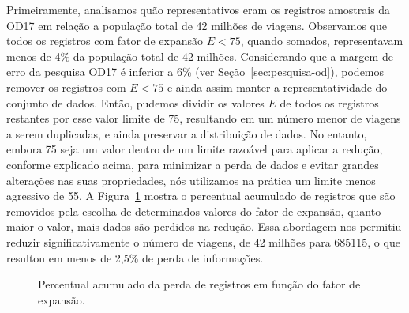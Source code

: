 Primeiramente, analisamos quão representativos eram os registros amostrais da
OD17 em relação a população total de 42 milhões de viagens. Observamos que todos os
registros com fator de expansão $E < 75$, quando somados, representavam menos de 4\% da população total de 42
milhões. Considerando que a margem de erro da pesquisa OD17 é inferior a 6\%
(ver Seção~\ref{sec:pesquisa-od}), podemos remover os registros com $E < 75$ e
ainda assim manter a representatividade do conjunto de dados. Então, pudemos dividir
os valores $E$ de todos os registros restantes por esse valor limite de 75,
resultando em um número menor de viagens a serem duplicadas, e ainda preservar
a distribuição de dados. No entanto, embora 75 seja um valor dentro de um
limite razoável para aplicar a redução, conforme explicado acima, para minimizar
a perda de dados e evitar grandes alterações nas suas propriedades, nós
utilizamos na prática um limite menos agressivo de 55. A
Figura~\ref{fig:expansion-factor} mostra o percentual acumulado de registros que
são removidos pela escolha de determinados valores do fator de expansão, quanto
maior o valor, mais dados são perdidos na redução. Essa abordagem nos permitiu
reduzir significativamente o número de viagens, de 42 milhões para \num{685115},
o que resultou em menos de 2,5\% de perda de informações.

\begin{figure}
\caption{Percentual acumulado da perda de registros em função do fator de expansão.}
\label{fig:expansion-factor}
\end{figure}

